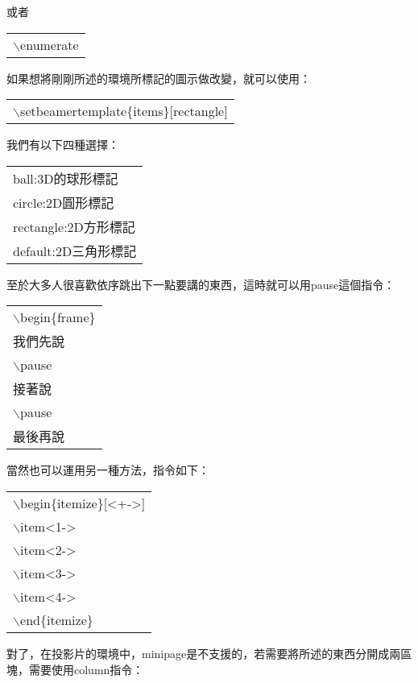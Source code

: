 或者
\begin{center}\colorbox{slight}{\begin{tabular}{p{}}
	{$\backslash$enumerate}
\end{tabular}}
\end{center}
如果想將剛剛所述的環境所標記的圖示做改變，就可以使用：
\begin{center}\colorbox{slight}{\begin{tabular}{p{}}
	{$\backslash$setbeamertemplate\{items\}[rectangle]}
\end{tabular}}
\end{center}
我們有以下四種選擇：
\begin{center}\colorbox{slight}{\begin{tabular}{p{}}
	ball:3D的球形標記\\
	circle:2D圓形標記\\
	rectangle:2D方形標記\\
	default:2D三角形標記\\
\end{tabular}}
\end{center}
至於大多人很喜歡依序跳出下一點要講的東西，這時就可以用pause這個指令：
\begin{center}\colorbox{slight}{\begin{tabular}{p{}}
	$\backslash$begin\{frame\}\\
	我們先說\\
	{$\backslash$pause}\\
	接著說\\
	{$\backslash$pause}\\
    最後再說\\
\end{tabular}}
\end{center}
當然也可以運用另一種方法，指令如下：
\begin{center}\colorbox{slight}{\begin{tabular}{p{}}
    $\backslash$begin\{itemize\}[<+->]\\
    $\backslash$item<1->\\
    $\backslash$item<2->\\
    $\backslash$item<3->\\
    $\backslash$item<4->\\
    $\backslash$end\{itemize\}\\
\end{tabular}}
\end{center}
對了，在投影片的環境中，minipage是不支援的，若需要將所述的東西分開成兩區塊，需要使用column指令：
